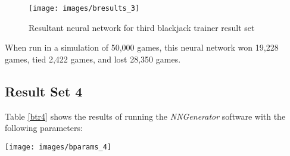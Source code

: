 \begin{figure}[h!]
  \centering
  \texttt{[image: images/bresults\_3]}
  \caption{Resultant neural network for third blackjack trainer result set}
  \label{bresults_3}
\end{figure}

When run in a simulation of 50,000 games, this neural network won 19,228
games, tied 2,422 games, and lost 28,350 games.

\subsection{Result Set 4}
Table \ref{btr4} shows the results of running the {\it NNGenerator} software with the following parameters:

\begin{center}
\texttt{[image: images/bparams\_4]}
\end{center}

